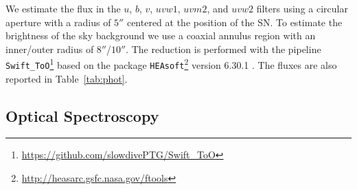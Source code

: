 \documentclass[twocolumn]{aastex631}
\begin{document}
\begin{CJK*}{UTF8}{gbsn}
We estimate the flux in the $u$, $b$, $v$, $uvw1$, $uvm2$, and $uvw2$ filters using a circular aperture with a radius of $5''$ centered at the position of the SN. To estimate the brightness of the sky background we use a coaxial annulus region with an inner/outer radius of $8''$/$10''$. The reduction is performed with the pipeline \texttt{Swift\_ToO}\footnote{\url{https://github.com/slowdivePTG/Swift\_ToO}} based on the package \texttt{HEAsoft}\footnote{\url{http://heasarc.gsfc.nasa.gov/ftools}} version 6.30.1 \citep{HEAsoft_2014}. The fluxes are also reported in Table~\ref{tab:phot}.


\subsection{Optical Spectroscopy}\label{sec:optical_spec}


\end{CJK*}
\end{document}
